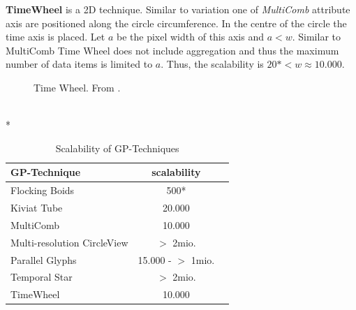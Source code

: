 \textbf{TimeWheel} is a 2D technique. Similar to variation one of \textit{MultiComb} attribute axis are positioned along the circle circumference. In the centre of the circle the time axis is placed. Let $a$ be the pixel width of this axis and $a < w$. Similar to MultiComb Time Wheel does not include aggregation and thus the maximum number of data items is limited to $a$. Thus, the scalability is $20* <w \approx 10.000$.
\begin{figure}[H]
    \centering
    \caption{Time Wheel. From \cite{Aigner2011}.}
    \label{fig:timewheel}
\end{figure}\\*

\begin{table}[H]
	\centering
	\caption[Scalability of GP-Techniques]{Scalability of GP-Techniques}
	\label{GPscalability}
	\begin{tabu}{lcc}
	\toprule
	GP-Technique & scalability \\
	\midrule
	Flocking Boids & 500* \\
	Kiviat Tube & 20.000 \\
	MultiComb & 10.000 \\
	Multi-resolution CircleView & $>$ 2mio.\\
	Parallel Glyphs &  15.000 - $>$ 1mio.\\
    Temporal Star &  $>$ 2mio.\\
	TimeWheel & 10.000\\
	\bottomrule
	\end{tabu}
\end{table}

